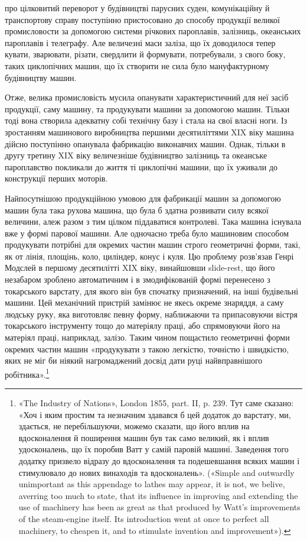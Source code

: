 \parcont{}  %
про цілковитий переворот у будівництві парусних суден, комунікаційну
й транспортову справу поступінно пристосовано до способу
продукції великої промисловости за допомогою системи річкових
пароплавів, залізниць, океанських пароплавів і телеграфу.
Але величезні маси заліза, що їх доводилося тепер кувати, зварювати,
різати, свердлити й формувати, потребували, з свого боку,
таких циклопічних машин, що їх створити не сила було мануфактурному
будівництву машин.

Отже, велика промисловість мусила опанувати характеристичний
для неї засіб продукції, саму машину, та продукувати машини
за допомогою машин. Тільки тоді вона створила адекватну собі
технічну базу і стала на свої власні ноги. Із зростанням машинового
виробництва першими десятиліттями XIX віку машина дійсно
поступінно опанувала фабрикацію виконавчих машин. Однак,
тільки в другу третину XIX віку величезніше будівництво
залізниць та океанське пароплавство покликали до життя ті
циклопічні машини, що їх уживали до конструкції перших
моторів.

Найпосутнішою продукційною умовою для фабрикації машин
за допомогою машин була така рухова машина, що була б здатна
розвивати силу всякої величини, алеж разом з тим цілком піддаватися
контролеві. Така машина існувала вже у формі парової
машини. Але одночасно треба було машиновим способом продукувати
потрібні для окремих частин машин строго геометричні
форми, такі, як от лінія, площінь, коло, циліндер, конус і куля.
Цю проблему розв’язав Генрі Модслей в першому десятилітті
XIX віку, винайшовши slide-rest, що його незабаром зроблено
автоматичним і в змодифікованій формі перенесено з токарського
варстату, для якого він був спочатку призначений, на інші будівельні
машини. Цей механічний пристрій замінює не якесь окреме
знаряддя, а саму людську руку, яка виготовляє певну форму, наближаючи
та припасовуючи вістря токарського інструменту тощо
до матеріялу праці, або спрямовуючи його на матеріял праці,
наприклад, залізо. Таким чином пощастило геометричні форми
окремих частин машин «продукувати з такою легкістю, точністю
і швидкістю, яких не міг би ніякий нагромаджений досвід дати
руці найвправнішого робітника».\footnote{
«The Industry of Nations», London 1855, part. II, p. 239. Тут
саме сказано: «Хоч і яким простим та незначним здавався б цей додаток
до варстату, ми, здається, не перебільшуючи, можемо сказати, що його
вплив на вдосконалення й поширення машин був так само великий, як і
вплив удосконалень, що їх поробив Ватт у самій паровій машині. Заведення
того додатку призвело відразу до вдосконалення та подешевшання
всяких машин і стимулювало до нових винаходів та вдосконалень».
(«Simple and outwardly unimportant as this appendage to lathes may appear,
it is not, we belive, averring too much to state, that its influence in
improving and extending the use of machinery has been as great as that
produced by Watt’s improvements of the steam-engine itself. Its introduction
went at once to perfect all machinery, to cheapen it, and to stimulate
invention and improvement»).
}
